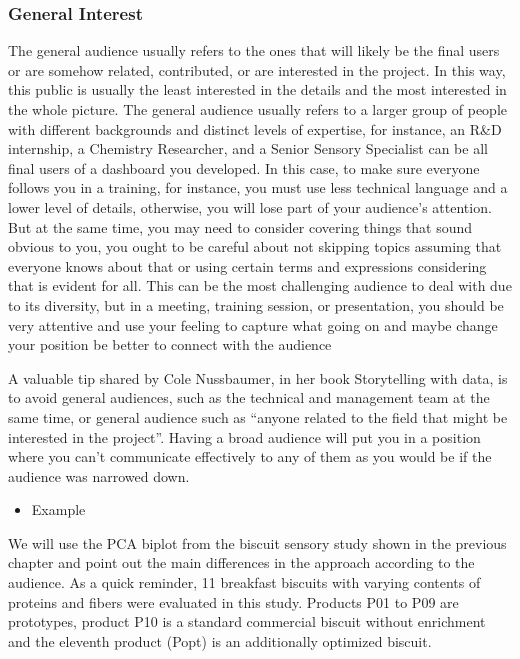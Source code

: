 \documentclass[
]{book}
\providecommand{\tightlist}{%
  \setlength{\itemsep}{0pt}\setlength{\parskip}{0pt}}
\begin{document}
\hypertarget{general-interest}{%
\subsubsection{General Interest}\label{general-interest}}

The general audience usually refers to the ones that will likely be the final users or are somehow related, contributed, or are interested in the project. In this way, this public is usually the least interested in the details and the most interested in the whole picture. The general audience usually refers to a larger group of people with different backgrounds and distinct levels of expertise, for instance, an R\&D internship, a Chemistry Researcher, and a Senior Sensory Specialist can be all final users of a dashboard you developed. In this case, to make sure everyone follows you in a training, for instance, you must use less technical language and a lower level of details, otherwise, you will lose part of your audience's attention. But at the same time, you may need to consider covering things that sound obvious to you, you ought to be careful about not skipping topics assuming that everyone knows about that or using certain terms and expressions considering that is evident for all. This can be the most challenging audience to deal with due to its diversity, but in a meeting, training session, or presentation, you should be very attentive and use your feeling to capture what going on and maybe change your position be better to connect with the audience

A valuable tip shared by Cole Nussbaumer, in her book Storytelling with data, is to avoid general audiences, such as the technical and management team at the same time, or general audience such as ``anyone related to the field that might be interested in the project''. Having a broad audience will put you in a position where you can't communicate effectively to any of them as you would be if the audience was narrowed down.

\begin{itemize}
\tightlist
\item
  Example
\end{itemize}

We will use the PCA biplot from the biscuit sensory study shown in the previous chapter and point out the main differences in the approach according to the audience. As a quick reminder, 11 breakfast biscuits with varying contents of proteins and fibers were evaluated in this study. Products P01 to P09 are prototypes, product P10 is a standard commercial biscuit without enrichment and the eleventh product (Popt) is an additionally optimized biscuit.
\end{document}
